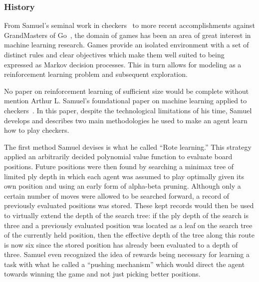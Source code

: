 

\subsubsection*{History}

From Samuel's seminal work in checkers~\cite{samuel_checkers}
to more recent accomplishments against GrandMasters of
Go~\cite{deepmind_alphago},
the domain of games has been an area of great interest in machine learning
research.
%
Games provide an isolated environment with a set of distinct rules and clear
objectives which make them well suited to being expressed as Markov decision
processes.
%
This in turn allows for modeling as a reinforcement learning problem and
subsequent exploration.



No paper on reinforcement learning of sufficient size would be complete without
mention Arthur L. Samuel's foundational paper on machine learning applied to
checkers~\cite{samuel_checkers}.
%
In this paper,
despite the technological limitations of his time,
Samuel develops and describes two main methodologies he used to make an agent
learn how to play checkers.

The first method Samuel devises is what he called ``Rote learning.''
%
This strategy applied an arbitrarily decided polynomial value function
to evaluate board positions.
%
Future positions were then found by searching a minimax tree
of limited ply depth
in which each agent was assumed to play optimally given its own position
and using an early form of alpha-beta pruning.
%
Although only a certain number of moves were allowed to be searched forward,
a record of previously evaluated positions was stored.
%
These kept records would then be used to virtually extend the depth of the
search tree:
if the ply depth of the search is three and a previously evaluated position was
located as a leaf on the search tree of the currently held position,
then the effective depth of the tree along this route is now six since the
stored position has already been evaluated to a depth of three.
%
Samuel even recognized the idea of rewards being necessary for learning a task
with what he called a ``pushing mechanism'' which would direct the agent towards
winning the game and not just picking better positions.


